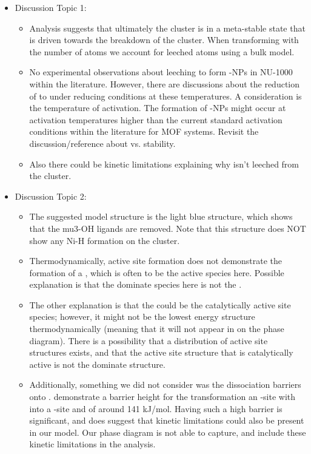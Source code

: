 \documentclass[journal=jctcce,manuscript=article]{achemso}
\begin{document}
\begin{itemize}
    \item Discussion Topic 1:
    \begin{itemize}
        \item Analysis suggests that ultimately the cluster is in a meta-stable state that is driven towards the breakdown of the cluster. When transforming with the number of  atoms we account for leeched  atoms using a bulk  model.
        \item No experimental observations about  leeching to form -NPs in NU-1000 within the literature. However, there are discussions about the reduction of  to  under  reducing conditions at these temperatures. A consideration is the temperature of activation. The formation of -NPs might occur at activation temperatures higher than the current standard activation conditions within the literature for MOF systems. Revisit the discussion/reference about  vs.  stability. 
        \item Also there could be kinetic limitations explaining why  isn't leeched from the cluster. 
    \end{itemize}
    \item Discussion Topic 2:
    \begin{itemize}
        \item The suggested model structure is the light blue structure, which shows that the mu3-OH ligands are removed. Note that this structure does NOT show any Ni-H formation on the cluster.
        \item Thermodynamically, active site formation does not demonstrate the formation of a , which is often to be the active species here. Possible explanation is that the dominate species here is not the . 
        \item The other explanation is that the  could be the catalytically active site species; however, it might not be the lowest energy structure thermodynamically (meaning that it will not appear in on the phase diagram). There is a possibility that a distribution of active site structures exists, and that the active site structure that is catalytically active is not the dominate structure. 
        \item Additionally, something we did not consider was the  dissociation barriers onto . \citeauthor{Li2016sintering} demonstrate a barrier height for the transformation an -site with  into a -site and  of around 141 kJ/mol. Having such a high barrier is significant, and does suggest that kinetic limitations could also be present in our model. Our phase diagram is not able to capture, and include these kinetic limitations in the analysis. 

\end{itemize}
\end{itemize}
\end{document}
